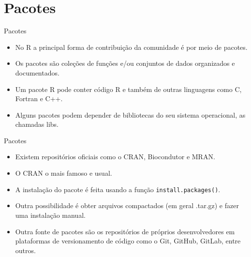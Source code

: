 \documentclass[
  ignorenonframetext,
  serif,
  professionalfont,
  usenames,
  dvipsnames,
  aspectratio = 169]{beamer}
\begin{document}
\section{Pacotes}\label{pacotes}

\begin{frame}{Pacotes}
\label{pacotes-1}
\begin{itemize}
\item
  No R a principal forma de contribuição da comunidade é por meio de
  pacotes.
\item
  Os pacotes são coleções de funções e/ou conjuntos de dados organizados
  e documentados.
\item
  Um pacote R pode conter código R e também de outras linguagens como C,
  Fortran e C++.
\item
  Alguns pacotes podem depender de bibliotecas do seu sistema
  operacional, as chamadas libs.
\end{itemize}
\end{frame}

\begin{frame}[fragile]{Pacotes}
\label{pacotes-2}
\begin{itemize}
\item
  Existem repositórios oficiais como o CRAN, Biocondutor e MRAN.
\item
  O CRAN o mais famoso e usual.
\item
  A instalação do pacote é feita usando a função
  \texttt{install.packages()}.
\item
  Outra possibilidade é obter arquivos compactados (em geral .tar.gz) e
  fazer uma instalação manual.
\item
  Outra fonte de pacotes são os repositórios de próprios desenvolvedores
  em plataformas de versionamento de código como o Git, GitHub, GitLab,
  entre outros.
\end{itemize}
\end{frame}
\end{document}
